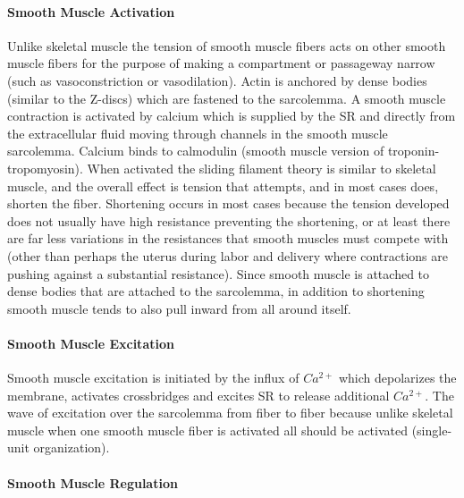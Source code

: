 \paragraph{Smooth Muscle Activation}

Unlike skeletal muscle the tension of smooth muscle fibers acts on other smooth muscle fibers for the purpose of making a compartment or passageway narrow (such as vasoconstriction or vasodilation). Actin is anchored by dense bodies (similar to the Z-discs) which are fastened to the sarcolemma. A smooth muscle contraction is activated by calcium which is supplied by the SR and directly from the  extracellular fluid moving through channels in the smooth muscle sarcolemma. Calcium binds to calmodulin (smooth muscle version of troponin-tropomyosin). When activated the sliding filament theory is similar to skeletal muscle, and the overall effect is tension that attempts, and in most cases does, shorten the fiber. Shortening occurs in most cases because the tension developed does not usually have high resistance preventing the shortening, or at least there are far less variations in the resistances that smooth muscles must compete with (other than perhaps the uterus during labor and delivery where contractions are pushing against a substantial resistance). Since smooth muscle is attached to dense bodies that are attached to the sarcolemma, in addition to shortening smooth muscle tends to also pull inward from all around itself. 

\paragraph{Smooth Muscle Excitation}

Smooth muscle excitation is initiated by the influx of $Ca^{2+}$ which depolarizes the membrane, activates crossbridges and excites SR to release additional $Ca^{2+}$. The wave of excitation over the sarcolemma from fiber to fiber because unlike skeletal muscle when one smooth muscle fiber is activated all should be activated (single-unit organization).

\paragraph{Smooth Muscle Regulation}

